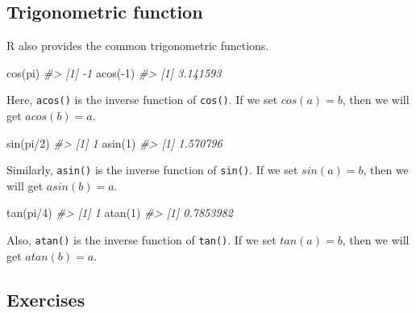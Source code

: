 \documentclass[
]{book}
\newenvironment{Shaded}{\begin{snugshade}}{\end{snugshade}}
\newcommand{\CommentTok}[1]{\textcolor[rgb]{0.56,0.35,0.01}{\textit{#1}}}
\newcommand{\DecValTok}[1]{\textcolor[rgb]{0.00,0.00,0.81}{#1}}
\newcommand{\FunctionTok}[1]{\textcolor[rgb]{0.00,0.00,0.00}{#1}}
\newcommand{\NormalTok}[1]{#1}
\newcommand{\SpecialCharTok}[1]{\textcolor[rgb]{0.00,0.00,0.00}{#1}}
\begin{document}
\hypertarget{trigonometric-function}{%
\subsection{Trigonometric function}\label{trigonometric-function}}

R also provides the common trigonometric functions.

\begin{Shaded}
\begin{Highlighting}[]
\FunctionTok{cos}\NormalTok{(pi)}
\CommentTok{\#\textgreater{} [1] {-}1}
\FunctionTok{acos}\NormalTok{(}\SpecialCharTok{{-}}\DecValTok{1}\NormalTok{)}
\CommentTok{\#\textgreater{} [1] 3.141593}
\end{Highlighting}
\end{Shaded}

Here, \texttt{acos()} is the inverse function of \texttt{cos()}. If we set \(cos(a) = b\), then we will get \(acos(b) = a\).

\begin{Shaded}
\begin{Highlighting}[]
\FunctionTok{sin}\NormalTok{(pi}\SpecialCharTok{/}\DecValTok{2}\NormalTok{)}
\CommentTok{\#\textgreater{} [1] 1}
\FunctionTok{asin}\NormalTok{(}\DecValTok{1}\NormalTok{)}
\CommentTok{\#\textgreater{} [1] 1.570796}
\end{Highlighting}
\end{Shaded}

Similarly, \texttt{asin()} is the inverse function of \texttt{sin()}. If we set \(sin(a) = b\), then we will get \(asin(b) = a\).

\begin{Shaded}
\begin{Highlighting}[]
\FunctionTok{tan}\NormalTok{(pi}\SpecialCharTok{/}\DecValTok{4}\NormalTok{)}
\CommentTok{\#\textgreater{} [1] 1}
\FunctionTok{atan}\NormalTok{(}\DecValTok{1}\NormalTok{)}
\CommentTok{\#\textgreater{} [1] 0.7853982}
\end{Highlighting}
\end{Shaded}

Also, \texttt{atan()} is the inverse function of \texttt{tan()}. If we set \(tan(a) = b\), then we will get \(atan(b) = a\).

\hypertarget{exercises-1}{%
\subsection{Exercises}\label{exercises-1}}
\end{document}
